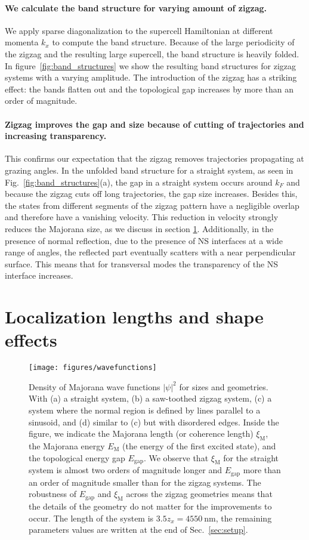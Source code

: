 \documentclass[english, twocolumn, 10pt, aps, superscriptaddress, floatfix, prb, citeautoscript]{revtex4-1}
\renewcommand{\comment}[2]{#2}
\renewcommand{\comment}{\paragraph}
\begin{document}
\comment{We calculate the band structure for varying amount of zigzag.}
We apply sparse diagonalization to the supercell Hamiltonian at different momenta $k_x$ to compute the band structure.
Because of the large periodicity of the zigzag and the resulting large supercell, the band structure is heavily folded.
In figure~\ref{fig:band_structures} we show the resulting band structures for zigzag systems with a varying amplitude.
The introduction of the zigzag has a striking effect: the bands flatten out and the topological gap increases by more than an order of magnitude.

\comment{Zigzag improves the gap and size because of cutting of trajectories and increasing transparency.}
This confirms our expectation that the zigzag removes trajectories propagating at grazing angles.
In the unfolded band structure for a straight system, as seen in Fig.~\ref{fig:band_structures}(a), the gap in a straight system occurs around $k_F$ and because the zigzag cuts off long trajectories, the gap size increases.
Besides this, the states from different segments of the zigzag pattern have a negligible overlap and therefore have a vanishing velocity.
This reduction in velocity strongly reduces the Majorana size, as we discuss in section \ref{sec:shape_effects}.
Additionally, in the presence of normal reflection, due to the presence of NS interfaces at a wide range of angles, the reflected part eventually scatters with a near perpendicular surface.
This means that for transversal modes the transparency of the NS interface increases.

\section{Localization lengths and shape effects}\label{sec:shape_effects}

\begin{figure}[!htb]
\texttt{[image: figures/wavefunctions]}
\caption{Density of Majorana wave functions $\left|\psi\right|^2$ for sizes and geometries.
With (a) a straight system, (b) a saw-toothed zigzag system, (c) a system where the normal region is defined by lines parallel to a sinusoid, and (d) similar to (c) but with disordered edges.
Inside the figure, we indicate the Majorana length (or coherence length) $\xi_\textrm{M}$, the Majorana energy $E_\textrm{M}$ (the energy of the first excited state), and the topological energy gap $E_\textrm{gap}$.
We observe that $\xi_\textrm{M}$ for the straight system is almost two orders of magnitude longer and $E_\textrm{gap}$ more than an order of magnitude smaller than for the zigzag systems.
The robustness of $E_\textrm{gap}$ and $\xi_\textrm{M}$ across the zigzag geometries means that the details of the geometry do not matter for the improvements to occur.
The length of the system is $3.5 z_x=\SI{4550}{\nm}$, the remaining parameters values are written at the end of Sec.~\ref{sec:setup}.\label{fig:wave_functions}}
\end{figure}
\end{document}
